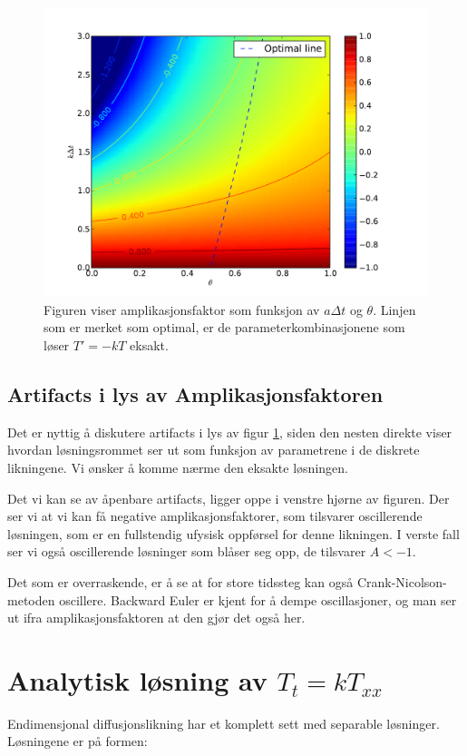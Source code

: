 \documentclass[a4paper, 10pt]{article}
\begin{document}
\begin{figure}[h!tb]
\includegraphics[width=\textwidth]{figures/ampFactor.pdf}
\caption{Figuren viser amplikasjonsfaktor som funksjon av $a\Delta t$ og $\theta$. Linjen som er merket som optimal, er de parameterkombinasjonene som løser $T'=-kT$ eksakt.}
\label{fig:ampFactor}
\end{figure}

\subsection{Artifacts i lys av Amplikasjonsfaktoren}
Det er nyttig å diskutere artifacts i lys av figur \ref{fig:ampFactor}, siden den nesten direkte viser hvordan løsningsrommet ser ut som funksjon av parametrene i de diskrete likningene. Vi ønsker å komme nærme den eksakte løsningen. 

Det vi kan se av åpenbare artifacts, ligger oppe i venstre hjørne av figuren. Der ser vi at vi kan få negative amplikasjonsfaktorer, som tilsvarer oscillerende løsningen, som er en fullstendig ufysisk oppførsel for denne likningen. I verste fall ser vi også oscillerende løsninger som blåser seg opp, de tilsvarer $A<-1$. 

Det som er overraskende, er å se at for store tidssteg kan også Crank-Nicolson-metoden oscillere. 
Backward Euler er kjent for å dempe oscillasjoner, og man ser ut ifra amplikasjonsfaktoren at den gjør det også her. 


\section{Analytisk løsning av $T_t = kT_{xx}$}
Endimensjonal diffusjonslikning har et komplett sett med separable løsninger. Løsningene er på formen:
\end{document}
